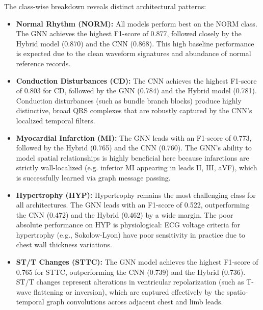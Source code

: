 \documentclass[12pt,a4paper]{report}
\begin{document}
The class-wise breakdown reveals distinct architectural patterns:
\begin{itemize}
    \item \textbf{Normal Rhythm (NORM):} All models perform best on the NORM class. The GNN achieves the highest F1-score of 0.877, followed closely by the Hybrid model (0.870) and the CNN (0.868). This high baseline performance is expected due to the clean waveform signatures and abundance of normal reference records.
    \item \textbf{Conduction Disturbances (CD):} The CNN achieves the highest F1-score of 0.803 for CD, followed by the GNN (0.784) and the Hybrid model (0.781). Conduction disturbances (such as bundle branch blocks) produce highly distinctive, broad QRS complexes that are robustly captured by the CNN's localized temporal filters.
    \item \textbf{Myocardial Infarction (MI):} The GNN leads with an F1-score of 0.773, followed by the Hybrid (0.765) and the CNN (0.760). The GNN's ability to model spatial relationships is highly beneficial here because infarctions are strictly wall-localized (e.g. inferior MI appearing in leads II, III, aVF), which is successfully learned via graph message passing.
    \item \textbf{Hypertrophy (HYP):} Hypertrophy remains the most challenging class for all architectures. The GNN leads with an F1-score of 0.522, outperforming the CNN (0.472) and the Hybrid (0.462) by a wide margin. The poor absolute performance on HYP is physiological: ECG voltage criteria for hypertrophy (e.g., Sokolow-Lyon) have poor sensitivity in practice due to chest wall thickness variations.
    \item \textbf{ST/T Changes (STTC):} The GNN model achieves the highest F1-score of 0.765 for STTC, outperforming the CNN (0.739) and the Hybrid (0.736). ST/T changes represent alterations in ventricular repolarization (such as T-wave flattening or inversion), which are captured effectively by the spatio-temporal graph convolutions across adjacent chest and limb leads.
\end{itemize}
\end{document}
